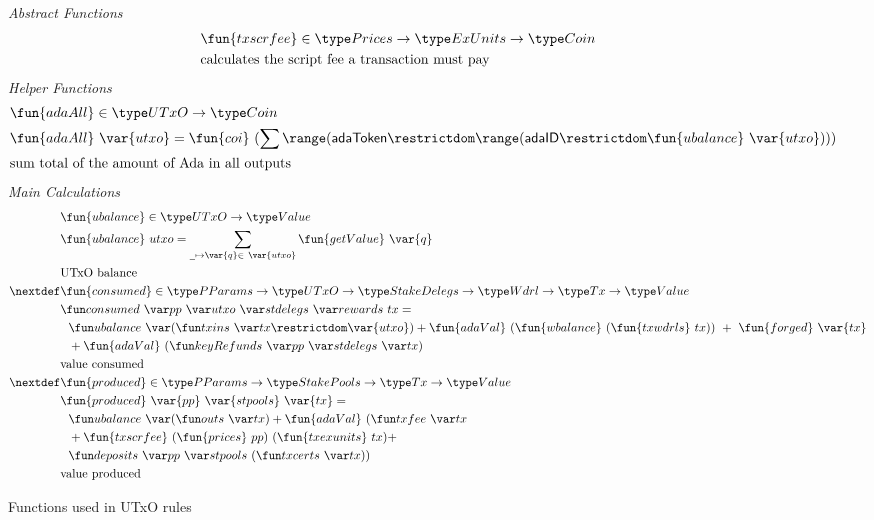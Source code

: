 \begin{figure}[htb]
  \emph{Abstract Functions}
  \begin{align*}
    & \fun{txscrfee} \in \Prices \to \ExUnits \to \Coin \\
    & \text{calculates the script fee a transaction must pay} \\
  \end{align*}
  \emph{Helper Functions}
  \begin{align*}
    & \fun{adaAll} \in \UTxO \to \Coin \\
    & \fun{adaAll}~{\var{utxo}} = \fun{coi}~
          (\sum  \range ({\mathsf{adaToken}} \restrictdom \range ({\mathsf{adaID}} \restrictdom
          \fun{ubalance}~\var{utxo}))) \\
    & \text{sum total of the amount of Ada in all outputs} \\
  \end{align*}
  \emph{Main Calculations}
  \begin{align*}
    & \fun{ubalance} \in \UTxO \to \Value \\
    & \fun{ubalance} ~ utxo = \sum_{\wcard\mapsto\var{q}\in~\var{utxo}}
    \fun{getValue}~\var{q} \\
    & \text{UTxO balance} \\
    \nextdef
    & \fun{consumed} \in \PParams \to \UTxO \to \StakeDelegs \to \Wdrl \to \Tx \to \Value \\
    & \consumed{pp}{utxo}{stdelegs}{rewards}~{tx} = \\
    & ~~\ubalance{(\txins{tx} \restrictdom \var{utxo})} +
        \fun{adaVal}~(\fun{wbalance}~(\fun{txwdrls}~{tx}))~+~\fun{forged}~\var{tx} \\
    & ~~ + \fun{adaVal}~(\keyRefunds{pp}{stdelegs}{tx}) \\
    & \text{value consumed} \\
    \nextdef
    & \fun{produced} \in \PParams \to \StakePools \to \Tx \to \Value \\
    & \fun{produced}~\var{pp}~\var{stpools}~\var{tx} = \\
    &~~\ubalance{(\outs{tx})}  + \fun{adaVal}~(\txfee{tx} \\
    &~~ + \fun{txscrfee}~(\fun{prices}~{pp})~(\fun{txexunits}~{tx}) + \\
    &~~ \deposits{pp}{stpools}~{(\txcerts{tx})})\\
    & \text{value produced} \\
  \end{align*}
  \caption{Functions used in UTxO rules}
  \label{fig:functions:utxo}
\end{figure}

